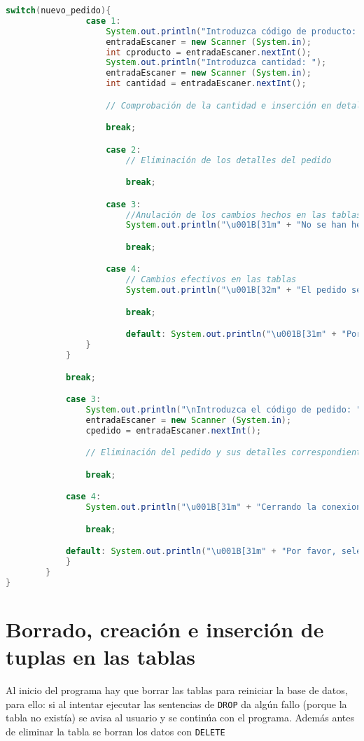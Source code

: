 \begin{lstlisting}[language=Java]
				switch(nuevo_pedido){
				case 1:
					System.out.println("Introduzca código de producto: ");
					entradaEscaner = new Scanner (System.in);
					int cproducto = entradaEscaner.nextInt();
					System.out.println("Introduzca cantidad: ");
					entradaEscaner = new Scanner (System.in);
					int cantidad = entradaEscaner.nextInt();

					// Comprobación de la cantidad e inserción en detalle pedido

					break;

					case 2:
						// Eliminación de los detalles del pedido

						break;

					case 3:
						//Anulación de los cambios hechos en las tablas
						System.out.println("\u001B[31m" + "No se han hecho efectivos los cambios" + "\u001B[0m");

						break;

					case 4:
						// Cambios efectivos en las tablas
						System.out.println("\u001B[32m" + "El pedido se ha guardado correctamente" + "\u001B[0m");

						break;

						default: System.out.println("\u001B[31m" + "Por favor, seleccione una opcion valida: " + "\u001B[0m");
				}
			}

			break;

			case 3:
				System.out.println("\nIntroduzca el código de pedido: ");
				entradaEscaner = new Scanner (System.in);
				cpedido = entradaEscaner.nextInt();

				// Eliminación del pedido y sus detalles correspondientes

				break;

			case 4:
				System.out.println("\u001B[31m" + "Cerrando la conexion..." + "\u001B[0m");

				break;

			default: System.out.println("\u001B[31m" + "Por favor, seleccione una opcion valida: " + "\u001B[0m");
			}
		}
}
\end{lstlisting}

\section{Borrado, creación e inserción de tuplas en las tablas}

Al inicio del programa hay que borrar las tablas para reiniciar la base de datos, para ello: si al intentar ejecutar las sentencias de \texttt{DROP} da algún fallo (porque la tabla no existía) se avisa al usuario y se continúa con el programa. Además antes de eliminar la tabla se borran los datos con \texttt{DELETE}

